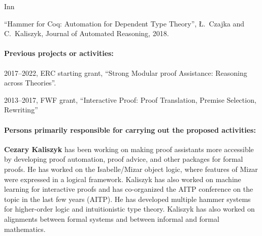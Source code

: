 \begin{sitedescription}{Inn}
\begin{compactitem}
\item ``Hammer for Coq: Automation for Dependent Type Theory'', Ł.~Czajka and C.~Kaliszyk, Journal of Automated Reasoning, 2018.
\end{compactitem}

\paragraph*{Previous projects or activities:}

\begin{compactitem}
\item 2017--2022, ERC starting grant, ``Strong Modular proof Assistance: Reasoning across Theories''.
\item 2013--2017, FWF grant, ``Interactive Proof: Proof Translation, Premise Selection, Rewriting''
\end{compactitem}




\paragraph*{Persons primarily responsible for carrying out the proposed activities:}

\begin{compactitem}
\item \textbf{Cezary Kaliszyk} has been working on making proof assistants
more accessible by developing proof automation, proof advice, and other packages for formal
proofs. He has worked on the Isabelle/Mizar object logic, where features of Mizar were
expressed in a logical framework. Kaliszyk has also worked on machine learning for interactive
proofs and has co-organized the AITP conference on the topic in the last few years (AITP). He
has developed multiple hammer systems for higher-order logic and intuitionistic type theory.
Kaliszyk has also worked on alignments between formal systems and between informal and formal
mathematics.
\end{compactitem}



\end{sitedescription}

